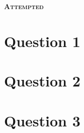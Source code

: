 \documentclass[a4paper, 12pt]{article}
\begin{document}
\begin{center}
    \fontsize{24pt}{10pt}\selectfont
    \textsc{\textbf{Attempted}}
\end{center}

\section{Question 1}

\newpage

\section{Question 2}

\newpage

\section{Question 3}
\end{document}
